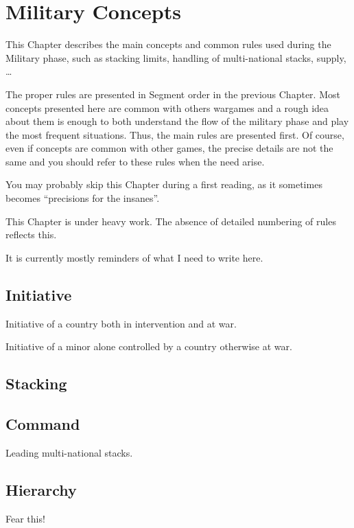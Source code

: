 
\chapter{Military Concepts}\label{chapter:MilitaryConcepts}

\begin{designnote}
  This Chapter describes the main concepts and common rules used
  during the Military phase, such as stacking limits, handling of
  multi-national stacks, supply, \ldots

  The proper rules are presented in Segment order in the previous
  Chapter. Most concepts presented here are common with others wargames and a
  rough idea about them is enough to both understand the flow of the military
  phase and play the most frequent situations. Thus, the main rules are
  presented first. Of course, even if concepts are common with other games,
  the precise details are not the same and you should refer to these rules
  when the need arise.

  You may probably skip this Chapter during a first reading, as it sometimes
  becomes ``precisions for the insanes''.
\end{designnote}

\begin{todo}
  This Chapter is under heavy work. The absence of detailed numbering of rules
  reflects this.

  It is currently mostly reminders of what I need to write here.
\end{todo}

\section{Initiative}
Initiative of a country both in intervention and at war.

Initiative of a minor alone controlled by a country otherwise at war.

\section{Stacking}

\section{Command}
Leading multi-national stacks.

\section{Hierarchy}
Fear this!


